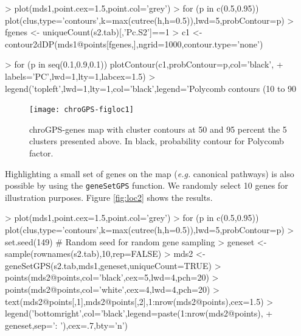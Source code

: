 \documentclass[a4paper,12pt,nogin]{article}
\newcommand{\newtext}[1]{{\color{blue} #1}} %
\begin{document}
\footnotesize

\begin{Schunk}
\begin{Sinput}
> plot(mds1,point.cex=1.5,point.col='grey')
> for (p in c(0.5,0.95)) plot(clus,type='contours',k=max(cutree(h,h=0.5)),lwd=5,probContour=p)
> fgenes <- uniqueCount(s2.tab)[,'Pc.S2']==1
> c1 <- contour2dDP(mds1@points[fgenes,],ngrid=1000,contour.type='none')
\end{Sinput}
\begin{Soutput}

\end{Soutput}
\begin{Sinput}
> for (p in seq(0.1,0.9,0.1)) plotContour(c1,probContour=p,col='black',
+ labels='PC',lwd=1,lty=1,labcex=1.5)
> legend('topleft',lwd=1,lty=1,col='black',legend='Polycomb contours (10 to 90%
\end{Sinput}
\end{Schunk}

\normalsize

\begin{figure}
\begin{center}
\begin{Schunk}
\begin{Soutput}

\end{Soutput}
\end{Schunk}
\texttt{[image: chroGPS-figloc1]}
\end{center}
\caption{chroGPS-genes map with cluster contours at 50 and 95 percent the 5
  clusters presented above. In black, probability contour for Polycomb
factor.}
\label{fig:loc1}
\end{figure}

\normalsize

Highlighting a small set of genes on the map
({\it e.g.} canonical pathways) 
is also possible by using the \texttt{geneSetGPS} function.
\newtext{We randomly select 10 genes for illustration purposes. Figure \ref{fig:loc2} shows the results.}

\footnotesize

\begin{Schunk}
\begin{Sinput}
> plot(mds1,point.cex=1.5,point.col='grey')
> for (p in c(0.5,0.95)) plot(clus,type='contours',k=max(cutree(h,h=0.5)),lwd=5,probContour=p)
> set.seed(149) # Random seed for random gene sampling
> geneset <- sample(rownames(s2.tab),10,rep=FALSE)
> mds2 <- geneSetGPS(s2.tab,mds1,geneset,uniqueCount=TRUE)
> points(mds2@points,col='black',cex=5,lwd=4,pch=20)
> points(mds2@points,col='white',cex=4,lwd=4,pch=20)
> text(mds2@points[,1],mds2@points[,2],1:nrow(mds2@points),cex=1.5)
> legend('bottomright',col='black',legend=paste(1:nrow(mds2@points),
+ geneset,sep=': '),cex=.7,bty='n')
\end{Sinput}
\end{Schunk}
\end{document}
